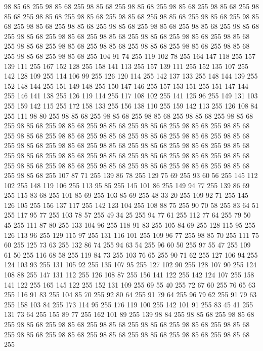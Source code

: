 98 85 68 255 98 85 68 255 98 85 68 255 98 85 68 255 98 85 68 255 98 85 68 255 98 85 68 255 98 85 68 255 98 85 68 255 98 85 68 255 98 85 68 255 98 85 68 255 98 85 68 255 98 85 68 255 98 85 68 255 98 85 68 255 98 85 68 255 98 85 68 255 98 85 68 255 98 85 68 255 98 85 68 255 98 85 68 255 98 85 68 255 98 85 68 255 98 85 68 255 98 85 68 255 98 85 68 255 98 85 68 255 98 85 68 255 98 85 68 255 98 85 68 255 98 85 68 255 98 85 68 255 104 91 74 255 119 102 78 255 164 147 118 255 157 139 111 255 167 152 128 255 158 141 113 255 157 139 111 255 152 135 107 255 142 128 109 255 114 106 99 255 126 120 114 255 142 137 133 255 148 144 139 255 152 148 144 255 151 149 148 255 150 147 146 255 157 153 151 255 151 147 144 255 146 141 138 255 126 119 114 255 117 108 102 255 141 125 96 255 149 131 103 255 159 142 115 255 172 158 133 255 156 138 110 255 159 142 113 255 126 108 84 255 111 98 80 255 98 85 68 255 98 85 68 255
98 85 68 255 98 85 68 255 98 85 68 255 98 85 68 255 98 85 68 255 98 85 68 255 98 85 68 255 98 85 68 255 98 85 68 255 98 85 68 255 98 85 68 255 98 85 68 255 98 85 68 255 98 85 68 255 98 85 68 255 98 85 68 255 98 85 68 255 98 85 68 255 98 85 68 255 98 85 68 255 98 85 68 255 98 85 68 255 98 85 68 255 98 85 68 255 98 85 68 255 98 85 68 255 98 85 68 255 98 85 68 255 98 85 68 255 98 85 68 255 98 85 68 255 98 85 68 255 98 85 68 255 98 85 68 255 107 87 71 255 139 86 78 255 129 75 69 255 93 60 56 255 145 112 102 255 148 119 106 255 113 95 85 255 145 101 86 255 149 94 77 255 139 86 69 255 115 83 68 255 101 85 69 255 103 85 69 255 48 33 20 255 109 92 71 255 145 126 105 255 156 137 117 255 142 123 104 255 108 88 75 255 90 70 58 255 83 64 51 255 117 95 77 255 103 78 57 255 49 34 25 255 94 77 61 255 112 77 64 255 79 50 45 255 111 87 80 255 133 104 96 255 118 91 83 255
105 84 69 255 128 115 95 255 126 113 96 255 129 115 97 255 131 116 101 255 109 96 77 255 98 85 70 255 111 75 60 255 125 73 63 255 132 86 74 255 94 63 54 255 96 60 50 255 97 55 47 255 109 61 50 255 116 68 58 255 119 84 73 255 103 76 65 255 90 71 62 255 127 106 94 255 124 103 93 255 131 105 92 255 135 107 95 255 127 102 90 255 128 107 90 255 124 108 88 255 147 131 112 255 126 108 87 255 156 141 122 255 142 124 107 255 158 141 122 255 165 145 122 255 152 131 109 255 69 55 40 255 72 67 60 255 76 65 63 255 116 91 83 255 104 85 70 255 92 80 64 255 91 79 64 255 96 79 62 255 91 79 63 255 158 103 84 255 173 114 95 255 176 119 100 255 142 101 91 255 83 45 41 255 131 73 64 255 155 89 77 255 162 101 89 255 139 98 84 255 98 85 68 255 98 85 68 255 98 85 68 255 98 85 68 255 98 85 68 255 98 85 68 255 98 85 68 255 98 85 68 255 98 85 68 255 98 85 68 255 98 85 68 255 98 85 68 255 98 85 68 255 98 85 68 255
